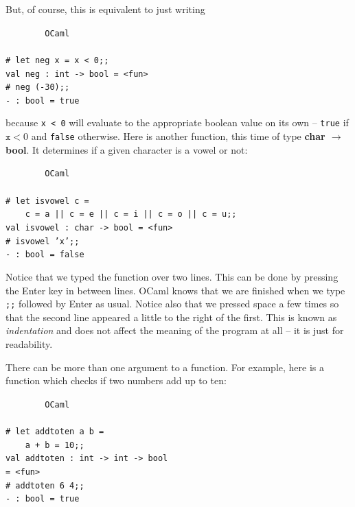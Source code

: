 \documentclass[]{book}
\newcommand\upquote[1]{\textquotesingle#1\textquotesingle}
\newcommand{\smspace}{\vspace{4mm}}
\begin{document}
\noindent But, of course, this is equivalent to just writing

\smspace
\noindent\verb!        OCaml!\\
\noindent\\
\noindent\verb!# let neg x = x < 0;;!\\
\noindent\verb!val neg : int -> bool = <fun>!\\
\noindent\texttt{\# neg (-30);;}\\
\noindent\verb!- : bool = true!
\smspace

\noindent because \texttt{x < 0} will evaluate to the appropriate boolean value on its own -- \texttt{true} if $\texttt{x} < 0$ and \texttt{false} otherwise. Here is another function, this time of type \textbf{\textrm{char $\rightarrow$ bool}}. It determines if a given character is a vowel or not:

\smspace
\noindent\verb!        OCaml!\\
\noindent\\
\noindent\verb!# let isvowel c =!\\
\noindent\mbox{\texttt{\ \ \ \ c = \upquote{a} || c = \upquote{e} || c = \upquote{i} || c = \upquote{o} || c = \upquote{u};;}}\\
\noindent\verb!val isvowel : char -> bool = <fun>!\\
\noindent\texttt{\# isvowel 'x';;}\\
\noindent\verb!- : bool = false!
\smspace

\noindent Notice that we typed the function over two lines. This can be done by pressing the Enter key in between lines. OCaml knows that we are finished when we type \texttt{;;} followed by Enter as usual. Notice also that we pressed space a few times so that the second line appeared a little to the right of the first. This is known as \textit{indentation} and does not affect the meaning of the program at all -- it is just for readability.

There can be more than one argument to a function. For example, here is a function which checks if two numbers add up to ten:

\smspace
\noindent\verb!        OCaml!\\
\noindent\\
\noindent\verb!# let addtoten a b =!\\
\noindent\verb!    a + b = 10;;!\\
\noindent\verb!val addtoten : int -> int -> bool!\\
\noindent\verb!= <fun>!\\
\noindent\texttt{\# addtoten 6 4;;}\\
\noindent\verb!- : bool = true!
\smspace
\end{document}
